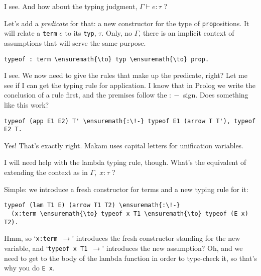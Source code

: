 \importantCodeblockEnd{}

\heroSTUDENT{} I see. And how about the typing judgment,
\(\Gamma \vdash e : \tau\) ?

\heroADVISOR{} Let's add a \emph{predicate} for that: a new constructor for
the type of \texttt{prop}ositions. It will relate a \texttt{term} \(e\)
to its \texttt{typ}, \(\tau\). Only, no \(\Gamma\), there is an implicit
context of assumptions that will serve the same purpose.

\importantCodeblock{}

\begin{verbatim}
typeof : term \ensuremath{\to} typ \ensuremath{\to} prop.
\end{verbatim}

\importantCodeblockEnd{}

\heroSTUDENT{} I see. We now need to give the rules that make up the
predicate, right? Let me see if I can get the typing rule for
application. I know that in Prolog we write the conclusion of a rule
first, and the premises follow the \texttt{\ensuremath{:\!-}} sign. Does something like
this work?

\importantCodeblock{}

\begin{verbatim}
typeof (app E1 E2) T' \ensuremath{:\!-} typeof E1 (arrow T T'), typeof E2 T.
\end{verbatim}

\importantCodeblockEnd{}

\heroADVISOR{} Yes! That's exactly right. Makam uses capital letters for
unification variables.

\heroSTUDENT{} I will need help with the lambda typing rule, though. What's
the equivalent of extending the context as in \(\Gamma, \; x : \tau\) ?

\heroADVISOR{} Simple: we introduce a fresh constructor for terms and a new
typing rule for it:

\importantCodeblock{}

\begin{verbatim}
typeof (lam T1 E) (arrow T1 T2) \ensuremath{:\!-}
  (x:term \ensuremath{\to} typeof x T1 \ensuremath{\to} typeof (E x) T2).
\end{verbatim}

\importantCodeblockEnd{}

\heroSTUDENT{} Hmm, so `\texttt{x:term\ \ensuremath{\to}}' introduces the fresh
constructor standing for the new variable, and
`\texttt{typeof\ x\ T1\ \ensuremath{\to}}' introduces the new assumption?
Oh, and we need to get to the body of the lambda function in order to
type-check it, so that's why you do \texttt{E\ x}.

